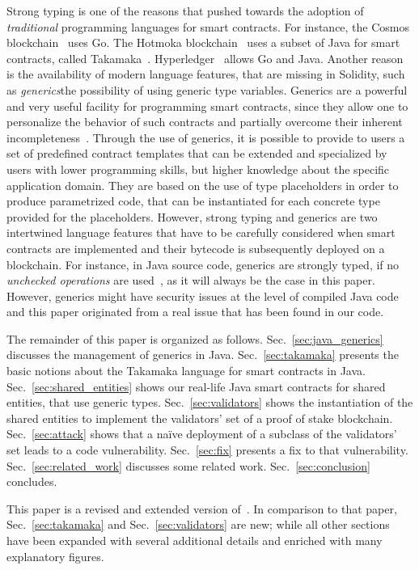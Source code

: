 Strong typing is one of the reasons that pushed towards the adoption
of \emph{traditional} programming languages for smart contracts. For instance,
the Cosmos blockchain~\cite{cosmos} uses Go. The
Hotmoka blockchain~\cite{hotmoka} uses a subset of Java
for smart contracts, called Takamaka~\cite{Spoto19,Spoto20}.
Hyperledger~\cite{hyperldeger} allows Go and Java.
Another reason is the availability of modern
language features, that are missing in Solidity,
such as \emph{generics}\ie the possibility of using
generic type variables. Generics are a powerful and very useful facility for programming
smart contracts, since they allow one to personalize the behavior of such contracts and partially overcome their inherent incompleteness~\cite{ebp}. 
%
Through the use of generics, it is possible to provide to users a set of predefined contract templates that can be extended and specialized by users with lower programming skills, but higher knowledge about the specific application domain. They are based on the use of type placeholders in order
to produce parametrized code, that can be instantiated for each
concrete type provided for the placeholders.
%
However, strong typing and generics are two intertwined language features that have to be carefully considered when smart contracts are implemented and their bytecode is subsequently deployed on a blockchain. For instance, in Java source code, generics are strongly typed, if no \emph{unchecked operations} are used~\cite{NaftalinW06}, as it will always be the case in this paper.
However, generics might have security issues at the level of compiled Java code and this paper originated from a real issue that has been found in our code.

The remainder of this paper is organized as follows.
Sec.~\ref{sec:java_generics} discusses the management of generics in Java.
Sec.~\ref{sec:takamaka} presents the basic notions about the Takamaka language for smart contracts in Java.
Sec.~\ref{sec:shared_entities} shows our real-life Java smart
contracts for shared entities, that use generic types.
Sec.~\ref{sec:validators} shows the instantiation of the shared entities to implement the validators' set
of a proof of stake blockchain.
Sec.~\ref{sec:attack} shows that a na\"{i}ve
deployment of a subclass of the validators' set leads to a code vulnerability.
Sec.~\ref{sec:fix} presents a fix to that vulnerability.
Sec.~\ref{sec:related_work} discusses some related work.
Sec.~\ref{sec:conclusion} concludes.

This paper is a revised and extended version of~\cite{BeniniGMS21}.
In comparison to that paper, Sec.~\ref{sec:takamaka} and
Sec.~\ref{sec:validators} are new; while all other sections have been expanded with several additional details and enriched with many explanatory figures.
